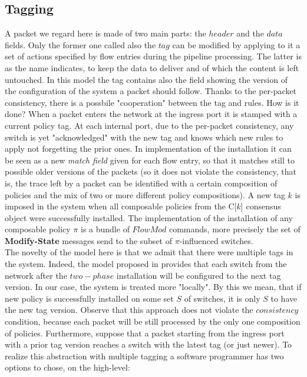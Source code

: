 \documentclass{article}
\theoremstyle{remark}
\begin{document}
\subsection{Tagging}
A packet we regard here is made of two main parts: the $header$ and the $data$ fields. Only the former one called also the $tag$ can be modified by applying to it a set of actions specified by flow entries during the pipeline processing. The latter is as the name indicates, to keep the data to deliver and of which the content is left untouched.
In this model the tag contains also the field showing the version of the configuration of the system a packet should follow. Thanks to the per-packet consistency, there is a possbile "cooperation" between the tag and rules.
How is it done? When a packet enters the network at the ingress port it is stamped with a current policy tag. At each internal port, due to the per-packet consistency, any switch is yet "acknowledged" with the new tag and knows which new rules to apply not forgetting the prior ones. In implementation of the installation it can be seen as a new \emph{match field} given for each flow entry, so that it matches still to possible older versions of the packets (so it does not violate the consistency, that is, the trace left by a packet can be identified with a certain composition of policies and the mix of two or more different policy compositions). 
A new tag $k$ is imposed in the system when all composable policies from the C[$k$] consensus object were successfully installed.
The implementation of the installation of any composable policy $\pi$ is a bundle of $FlowMod$ commands, more precisely the set of \textbf{Modify-State} messages send to the subset of $\pi$-influenced switches. \\
The novelty of the model here is that we admit that there were multiple tags in the system. Indeed, the model proposed in \cite{Reitblatt:2012:ANU:2342356.2342427} provides that each switch from the network after the $two-phase$ installation will be configured to the next tag version. In our case, the system is treated more "locally". By this we mean, that if new policy is successfully installed on some set $S$ of switches, it is only $S$ to have the new tag version. Observe that this approach does not violate the $consistency$ condition, because each packet will be still processed by the only one composition of policies. Furthermore, suppose that a packet starting from the ingress port with a prior tag version reaches a switch with the latest tag (or just newer). To realize this abstraction with multiple tagging a software programmer has two options to chose, on the high-level:
\end{document}
